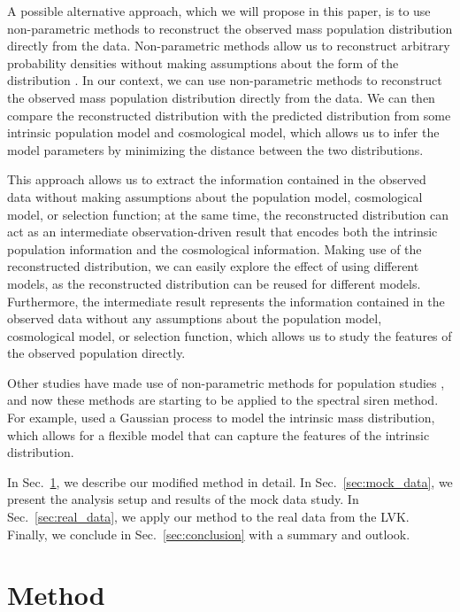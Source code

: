 \documentclass[sn-aps, pdflatex, iicol]{sn-jnl}
\begin{document}
A possible alternative approach, which we will propose in this paper, is to use non-parametric methods to reconstruct the observed mass population distribution directly from the data.
Non-parametric methods allow us to reconstruct arbitrary probability densities without making assumptions about the form of the distribution \citep{Rinaldi:2021bhm}.
In our context, we can use non-parametric methods to reconstruct the observed mass population distribution directly from the data.
We can then compare the reconstructed distribution with the predicted distribution from some intrinsic population model and cosmological model, which allows us to infer the model parameters by minimizing the distance between the two distributions.

This approach allows us to extract the information contained in the observed data without making assumptions about the population model, cosmological model, or selection function; at the same time, the reconstructed distribution can act as an intermediate observation-driven result that encodes both the intrinsic population information and the cosmological information.
Making use of the reconstructed distribution, we can easily explore the effect of using different models, as the reconstructed distribution can be reused for different models.
Furthermore, the intermediate result represents the information contained in the observed data without any assumptions about the population model, cosmological model, or selection function, which allows us to study the features of the observed population directly.

Other studies have made use of non-parametric methods for population studies \citep[e.g.,][]{Mandel:2018mve, Tiwari:2020vym, Rinaldi:2021bhm, Edelman:2021zkw, Sadiq:2021fin, Edelman:2022ydv, Callister:2023tgi, Ray:2023upk}, and now these methods are starting to be applied to the spectral siren method.
For example, \cite{Farah:2024xub} used a Gaussian process to model the intrinsic mass distribution, which allows for a flexible model that can capture the features of the intrinsic distribution.

In Sec.~\ref{sec:method}, we describe our modified method in detail.
In Sec.~\ref{sec:mock_data}, we present the analysis setup and results of the mock data study.
In Sec.~\ref{sec:real_data}, we apply our method to the real data from the \ac{LVK}.
Finally, we conclude in Sec.~\ref{sec:conclusion} with a summary and outlook.

\section{Method}
\label{sec:method}
\end{document}
